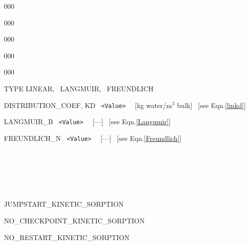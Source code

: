 \documentclass[12pt]{article}
\begin{document}
\begin{deflist}{000}
\begin{deflist}{000}
\begin{deflist}{000}
\begin{deflist}{000}
\begin{deflist}{000}
\item [TYPE] LINEAR, \ LANGMUIR, \ FREUNDLICH
\item [DISTRIBUTION\_COEF, KD] \ {\tt <Value>} \ \ [kg water/m$^3$ bulk] \ [see Eqn.\eqref{linkd}]
\item [LANGMUIR\_B] \ {\tt <Value>} \ \ [---] \ [see Eqn.\eqref{Langmuir}]
\item [FREUNDLICH\_N] \ {\tt <Value>} \ \ [---] \ [see Eqn.\eqref{Freundlich}]
\end{deflist}
\item [\keyend] ~

\end{deflist}

\item [\keyend] ~

~\\

\item[JUMPSTART\_KINETIC\_SORPTION]
\item[NO\_CHECKPOINT\_KINETIC\_SORPTION]
\item[NO\_RESTART\_KINETIC\_SORPTION]
\end{deflist}


\end{deflist}
\end{deflist}
\end{document}

